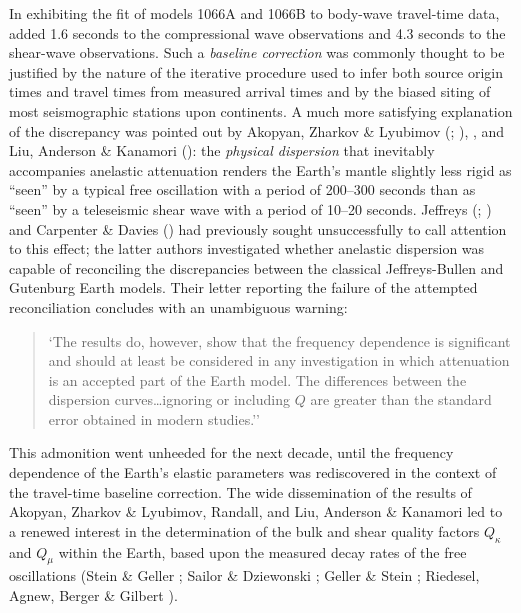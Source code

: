 In exhibiting the fit of models 1066A and 1066B to
body-wave travel-time data, \textcite{gilbert&dziewonski75}
added 1.6 seconds to the compressional wave observations
and 4.3 seconds to the shear-wave observations.
Such a {\em baseline correction\/}
%
was commonly thought
to be justified by the nature of the iterative procedure
used to infer both source origin times and travel
times from measured arrival times and by the biased
siting of most seismographic stations upon continents.
A much more satisfying explanation of the discrepancy
was pointed out by Akopyan, Zharkov \& Lyubimov
(\citeyear{akopyan&al75}; \citeyear{akopyan&al76}),
\textcite{randall76}, and Liu, Anderson \& Kanamori
(\citeyear{liu&al76}): the {\em physical dispersion\/}
%
%
that inevitably accompanies anelastic attenuation
renders the Earth's mantle slightly less rigid as
``seen'' by a typical free oscillation with a period
of 200--300 seconds than as ``seen'' by a teleseismic
shear wave with a period of 10--20 seconds.  Jeffreys
(\citeyear{jeffreys58a}; \citeyear{jeffreys58b}) and
Carpenter \& Davies (\citeyear{carpenter&davies66})
had previously sought unsuccessfully to call attention
to this effect; the latter authors investigated whether
anelastic dispersion was capable of reconciling the discrepancies
between the classical Jeffreys-Bullen and Gutenburg Earth models.
Their letter reporting the failure of the attempted
reconciliation concludes with an unambiguous warning:
\begin{quote}
`The results do, however, show that the frequency dependence
is significant and should at least be considered in any investigation
in which attenuation is an accepted part of the Earth model.
The differences between the dispersion curves\ldots ignoring or
including $Q$ are greater than the standard error obtained in
modern studies.''
\end{quote}
This admonition went unheeded for the next decade, until the
frequency dependence of the Earth's elastic parameters was
rediscovered in the context of the travel-time baseline correction.
The wide dissemination of the results of Akopyan, Zharkov
\& Lyubimov, Randall, and Liu, Anderson \& Kanamori
led to a renewed interest in the determination
of the bulk and shear quality factors $Q_{\kappa}$
and $Q_{\mu}$ within the Earth, based upon
the measured decay rates of the free oscillations
(Stein \& Geller \citeyear{stein&geller78};
Sailor \& Dziewonski \citeyear{sailor&dziewonski78};
Geller \& Stein \citeyear{geller&stein79};
Riedesel, Agnew, Berger \& Gilbert \citeyear{riedesel&al80}).

